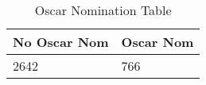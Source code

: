 \begin{table}[H]
\centering
\begin{tabular}{ll}
  \hline
No Oscar Nom & Oscar Nom \\ 
  \hline
2642 & 766 \\ 
   \hline
\end{tabular}
\caption{Oscar Nomination Table} 
\label{tab:on}
\end{table}

